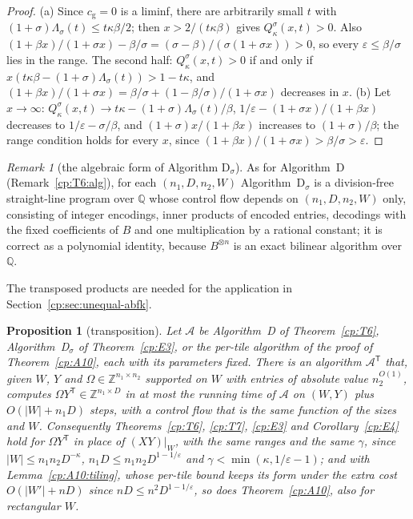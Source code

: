 \documentclass[11pt]{article}
\newtheorem{proposition}[theorem]{Proposition}
\theoremstyle{definition}
\theoremstyle{remark}
\newtheorem{remark}[theorem]{Remark}
\providecommand{\eps}{\varepsilon}
\providecommand{\Z}{\mathbb{Z}}
\providecommand{\Q}{\mathbb{Q}}
\newcommand{\abs}[1]{\lvert #1\rvert}
\newcommand{\Lam}{\Lambda}                    %
\newcommand{\cg}{c_{\mathrm g}}               %
\newcommand{\AlgD}{Algorithm~D}                             %
\newcommand{\Qgain}[2]{Q^{#1}_{#2}}           %
\begin{document}
\begin{proof}
(a) Since $\cg=0$ is a liminf, there are arbitrarily small $t$ with $(1+\sigma)\Lam_\sigma(t)\le t\kappa\beta/2$; then $x>2/(t\kappa\beta)$ gives $\Qgain\sigma\kappa(x,t)>0$. Also $(1+\beta x)/(1+\sigma x)-\beta/\sigma=(\sigma-\beta)/(\sigma(1+\sigma x))>0$, so every $\eps\le\beta/\sigma$ lies in the range. The second half: $\Qgain\sigma\kappa(x,t)>0$ if and only if $x(t\kappa\beta-(1+\sigma)\Lam_\sigma(t))>1-t\kappa$, and $(1+\beta x)/(1+\sigma x)=\beta/\sigma+(1-\beta/\sigma)/(1+\sigma x)$ decreases in $x$. (b) Let $x\to\infty$: $\Qgain\sigma\kappa(x,t)\to t\kappa-(1+\sigma)\Lam_\sigma(t)/\beta$, $1/\eps-(1+\sigma x)/(1+\beta x)$ decreases to $1/\eps-\sigma/\beta$, and $(1+\sigma)x/(1+\beta x)$ increases to $(1+\sigma)/\beta$; the range condition holds for every $x$, since $(1+\beta x)/(1+\sigma x)>\beta/\sigma>\eps$.
\end{proof}

\begin{remark}[the algebraic form of Algorithm D$_\sigma$]\label{cp:E4:alg}
As for \AlgD{} (Remark~\ref{cp:T6:alg}), for each $(n_1,D,n_2,W)$ Algorithm~D$_\sigma$ is a division-free straight-line program over $\Q$ whose control flow depends on $(n_1,D,n_2,W)$ only, consisting of integer encodings, inner products of encoded entries, decodings with the fixed coefficients of $B$ and one multiplication by a rational constant; it is correct as a polynomial identity, because $B^{\otimes n}$ is an exact bilinear algorithm over~$\Q$.
\end{remark}

The transposed products are needed for the application in Section~\ref{cp:sec:unequal-abfk}.

\begin{proposition}[transposition]\label{cp:E5}
Let $\mathcal A$ be \AlgD{} of Theorem~\ref{cp:T6}, Algorithm~D$_\sigma$ of Theorem~\ref{cp:E3}, or the per-tile algorithm of the proof of Theorem~\ref{cp:A10}, each with its parameters fixed. There is an algorithm $\mathcal A^{\mathsf T}$ that, given $W$, $Y$ and $\Omega\in\Z^{n_1\times n_2}$ supported on $W$ with entries of absolute value $n_2^{O(1)}$, computes $\Omega Y^{\mathsf T}\in\Z^{n_1\times D}$ in at most the running time of $\mathcal A$ on $(W,Y)$ plus $O(\abs W+n_1D)$ steps, with a control flow that is the same function of the sizes and $W$. Consequently Theorems~\ref{cp:T6}, \ref{cp:T7}, \ref{cp:E3} and Corollary~\ref{cp:E4} hold for $\Omega Y^{\mathsf T}$ in place of $(XY)|_W$, with the same ranges and the same $\gamma$, since $\abs W\le n_1n_2D^{-\kappa}$, $n_1D\le n_1n_2D^{1-1/\eps}$ and $\gamma<\min(\kappa,1/\eps-1)$; and with Lemma~\ref{cp:A10:tiling}, whose per-tile bound keeps its form under the extra cost $O(\abs{W'}+nD)$ since $nD\le n^2D^{1-1/\eps}$, so does Theorem~\ref{cp:A10}, also for rectangular $W$.
\end{proposition}
\end{document}
